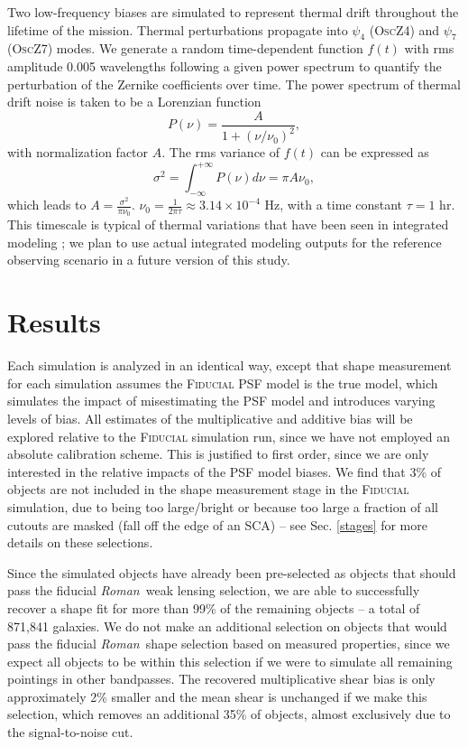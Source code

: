 \documentclass[usenatbib]{mnras}
\newcommand{\wfirst}{{\slshape Roman}}
\begin{document}
Two low-frequency biases are simulated to represent thermal drift throughout the lifetime of the mission. Thermal perturbations propagate into $\psi_4$ (\textsc{OscZ4})  and $\psi_7$ (\textsc{OscZ7}) modes.
We generate a random time-dependent function $f(t)$ with rms amplitude 0.005 wavelengths following a given power spectrum to quantify the perturbation of the Zernike coefficients over time. 
The power spectrum of thermal drift noise is taken to be a Lorenzian function 
\begin{equation}
P(\nu)=\frac{A}{1+(\nu/\nu_0)^2},
\end{equation}
with normalization factor $A$. The rms variance of $f(t)$ can be expressed as
\begin{equation}
\sigma^2 = \int_{-\infty}^{+\infty}P(\nu)d\nu=\pi A\nu_0,
\end{equation}
which leads to $A=\frac{\sigma^2}{\pi\nu_0}$. $\nu_0=\frac{1}{2\pi\tau}\approx 3.14\times10^{-4}$ Hz, with a time constant $\tau=1$ hr. This timescale is typical of thermal variations that have been seen in integrated modeling \citep[e.g.][]{2015arXiv150303757S}; we plan to use actual integrated modeling outputs for the reference observing scenario in a future version of this study.

\section{Results}\label{sec:results2}

Each simulation is analyzed in an identical way, except that shape measurement for each simulation assumes the \textsc{Fiducial} PSF model is the true model, which simulates the impact of misestimating the PSF model and introduces varying levels of bias. 
All estimates of the multiplicative and additive bias will be explored relative to the \textsc{Fiducial} simulation run, since we have not employed an absolute calibration scheme. 
This is justified to first order, since we are only interested in the relative impacts of the PSF model biases.
We find that 3\% of objects are not included in the shape measurement stage in the \textsc{Fiducial} simulation, due to being too large/bright or because too large a fraction of all cutouts are masked (fall off the edge of an SCA) -- see Sec. \ref{stages} for more details on these selections. 

Since the simulated objects have already been pre-selected as objects that should pass the fiducial \wfirst\ weak lensing selection, we are able to successfully recover a shape fit for more than 99\% of the remaining objects -- a total of 871,841 galaxies. 
We do not make an additional selection on objects that would pass the fiducial \wfirst\ shape selection based on measured properties, since we expect all objects to be within this selection if we were to simulate all remaining pointings in other bandpasses. 
The recovered multiplicative shear bias is only approximately 2\% smaller and the mean shear is unchanged if we make this selection, which removes an additional 35\% of objects, almost exclusively due to the signal-to-noise cut.
\end{document}
